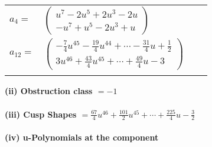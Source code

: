 \documentclass[1p]{elsarticle_modified}
\theoremstyle{definition}
\begin{document}
\begin{tabular}{m{7pt} m{180pt} m{7pt} m{180pt} }
\flushright $a_{4}=$&$\begin{pmatrix}u^7-2 u^5+2 u^3-2 u\\- u^7+u^5-2 u^3+u\end{pmatrix}$ \\
\flushright $a_{12}=$&$\begin{pmatrix}-\frac{7}{4} u^{45}-\frac{19}{4} u^{44}+\cdots-\frac{31}{4} u+\frac{1}{2}\\3 u^{46}+\frac{43}{4} u^{45}+\cdots+\frac{49}{4} u-3\end{pmatrix}$\\&\end{tabular}
\flushleft \textbf{(ii) Obstruction class $= -1$}\\~\\
\flushleft \textbf{(iii) Cusp Shapes $= \frac{67}{4} u^{46}+\frac{101}{2} u^{45}+\cdots+\frac{225}{4} u-\frac{3}{2}$}\\~\\
\newpage\renewcommand{\arraystretch}{1}
\flushleft \textbf{(iv) u-Polynomials at the component}\newline \\
\end{document}

